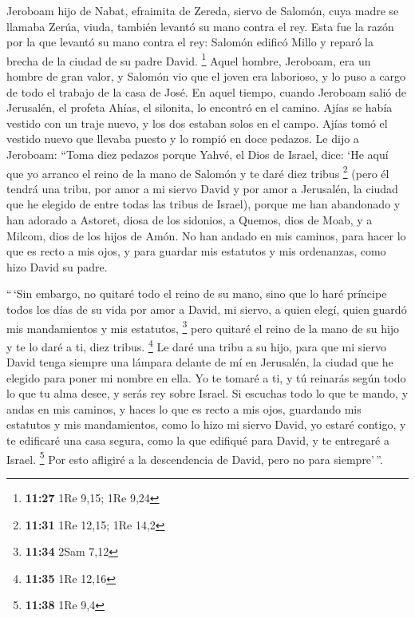 \begin{paracol}{2}
 Jeroboam hijo de Nabat, efraimita de Zereda, siervo de
Salomón, cuya madre se llamaba Zerúa, viuda, también levantó su mano
contra el rey.  Esta fue la razón por la que levantó su
mano contra el rey: Salomón edificó Millo y reparó la brecha de la
ciudad de su padre David. \footnote{\textbf{11:27} 1Re 9,15; 1Re 9,24}
 Aquel hombre, Jeroboam, era un hombre de gran valor, y
Salomón vio que el joven era laborioso, y lo puso a cargo de todo el
trabajo de la casa de José.  En aquel tiempo, cuando
Jeroboam salió de Jerusalén, el profeta Ahías, el silonita, lo encontró
en el camino. Ajías se había vestido con un traje nuevo, y los dos
estaban solos en el campo.  Ajías tomó el vestido nuevo
que llevaba puesto y lo rompió en doce pedazos.  Le dijo
a Jeroboam: ``Toma diez pedazos porque Yahvé, el Dios de Israel, dice:
`He aquí que yo arranco el reino de la mano de Salomón y te daré diez
tribus \footnote{\textbf{11:31} 1Re 12,15; 1Re 14,2} 
(pero él tendrá una tribu, por amor a mi siervo David y por amor a
Jerusalén, la ciudad que he elegido de entre todas las tribus de
Israel),  porque me han abandonado y han adorado a
Astoret, diosa de los sidonios, a Quemos, dios de Moab, y a Milcom, dios
de los hijos de Amón. No han andado en mis caminos, para hacer lo que es
recto a mis ojos, y para guardar mis estatutos y mis ordenanzas, como
hizo David su padre.

 ``\,`Sin embargo, no quitaré todo el reino de su mano,
sino que lo haré príncipe todos los días de su vida por amor a David, mi
siervo, a quien elegí, quien guardó mis mandamientos y mis estatutos,
\footnote{\textbf{11:34} 2Sam 7,12}  pero quitaré el
reino de la mano de su hijo y te lo daré a ti, diez tribus. \footnote{\textbf{11:35}
  1Re 12,16}  Le daré una tribu a su hijo, para que mi
siervo David tenga siempre una lámpara delante de mí en Jerusalén, la
ciudad que he elegido para poner mi nombre en ella.  Yo
te tomaré a ti, y tú reinarás según todo lo que tu alma desee, y serás
rey sobre Israel.  Si escuchas todo lo que te mando, y
andas en mis caminos, y haces lo que es recto a mis ojos, guardando mis
estatutos y mis mandamientos, como lo hizo mi siervo David, yo estaré
contigo, y te edificaré una casa segura, como la que edifiqué para
David, y te entregaré a Israel. \footnote{\textbf{11:38} 1Re 9,4}
 Por esto afligiré a la descendencia de David, pero no
para siempre'\,''.


\end{paracol}
